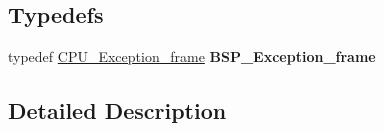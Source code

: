 \subsection*{Typedefs}
\begin{DoxyCompactItemize}
\item 
\mbox{\label{group__ppc__exc__frame_gae2cd0cfba14ccbb26c2bdcd45d581b18}} 
typedef \mbox{\hyperlink{structCPU__Exception__frame}{C\+P\+U\+\_\+\+Exception\+\_\+frame}} {\bfseries B\+S\+P\+\_\+\+Exception\+\_\+frame}
\end{DoxyCompactItemize}


\subsection{Detailed Description}
